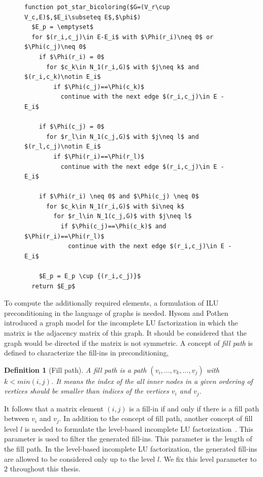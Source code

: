 \documentclass[12pt, twoside,a4paper,toc=bibliography]{scrbook}
\newtheorem{definition}{Definition}
\begin{document}
\begin{figure}
\begin{lstlisting}[caption=Find potentially required elements for star bicoloring,label=code.pot.sb,mathescape]
function pot_star_bicoloring($G=(V_r\cup V_c,E)$,$E_i\subseteq E$,$\phi$)
  $E_p = \emptyset$
  for $(r_i,c_j)\in E-E_i$ with $\Phi(r_i)\neq 0$ or $\Phi(c_j)\neq 0$
    if $\Phi(r_i) = 0$
      for $c_k\in N_1(r_i,G)$ with $j\neq k$ and $(r_i,c_k)\notin E_i$
        if $\Phi(c_j)==\Phi(c_k)$
          continue with the next edge $(r_i,c_j)\in E - E_i$

    if $\Phi(c_j) = 0$
      for $r_l\in N_1(c_j,G)$ with $j\neq l$ and $(r_l,c_j)\notin E_i$
        if $\Phi(r_i)==\Phi(r_l)$
          continue with the next edge $(r_i,c_j)\in E - E_i$

    if $\Phi(r_i) \neq 0$ and $\Phi(c_j) \neq 0$
      for $c_k\in N_1(r_i,G)$ with $i\neq k$
        for $r_l\in N_1(c_j,G)$ with $j\neq l$
          if $\Phi(c_j)==\Phi(c_k)$ and $\Phi(r_i)==\Phi(r_l)$
            continue with the next edge $(r_i,c_j)\in E - E_i$

    $E_p = E_p \cup {(r_i,c_j)}$
  return $E_p$
\end{lstlisting}
\end{figure}

To compute the additionally required elements, a formulation of ILU preconditioning
in the language of graphs is needed.
Hysom and Pothen~\cite{precond-pothen} introduced a graph model for the incomplete
LU factorization in which the matrix is the adjacency matrix of this graph.
It should be considered that the graph would be directed if the matrix is not symmetric.
A concept of \textit{fill path} is defined to characterize the fill-ins in preconditioning,
\begin{definition}[Fill path]\label{d.fill.path}
A fill path is a path $(v_i,...,v_k,...,v_j)$ with
$k<min(i,j)$. It means the index of the all inner nodes in a given ordering of vertices
should be smaller than indices of the vertices $v_i$ and $v_j$.
\end{definition}
It follows that a matrix element $(i,j)$ is a fill-in if and only if there is a fill path between
$v_i$ and $v_j$.
In addition to the concept of fill path, another concept of fill level $l$ is needed to
formulate the level-based incomplete LU factorization~\cite{precond-pothen}.
This parameter is used to filter the generated fill-ins.
This parameter is the length of the fill path.
In the level-based incomplete LU factorization, the generated fill-ins are allowed
to be considered only up to the level $l$.
We fix this level parameter to $2$ throughout this thesis.
\end{document}
